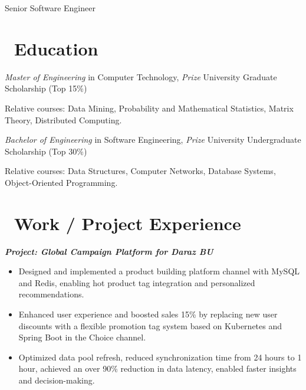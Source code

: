 \documentclass{resume}
\begin{document}

 \centerline{Senior Software Engineer}
\vspace{1ex}
 \vspace{-3ex}
 
\section{\faGraduationCap\ Education}
  \textit{Master of Engineering} in Computer Technology, \textit{ Prize} University Graduate Scholarship (Top 15\%)

 Relative courses: Data Mining, Probability and Mathematical Statistics, Matrix Theory, Distributed Computing.

 \textit{Bachelor of Engineering} in Software Engineering, \textit{ Prize} University Undergraduate Scholarship (Top 30\%)

Relative courses: Data Structures, Computer Networks, Database Systems, Object-Oriented Programming.

\section{\faUsers\ Work / Project Experience}


\setlength{\parindent}{1em}

\textit{\textbf{\hspace{1em}Project: Global Campaign Platform for Daraz BU}}
\begin{itemize}
  \item Designed and implemented a product building platform channel with MySQL and Redis, enabling hot product tag integration and personalized recommendations.
    \item Enhanced user experience and boosted sales 15\% by replacing new user discounts with a flexible promotion tag system based on Kubernetes and Spring Boot in the Choice channel.
    \item Optimized data pool refresh, reduced synchronization time from 24 hours to 1 hour, achieved an over 90\% reduction in data latency, enabled faster insights and decision-making.
    
\end{itemize}
\end{document}
